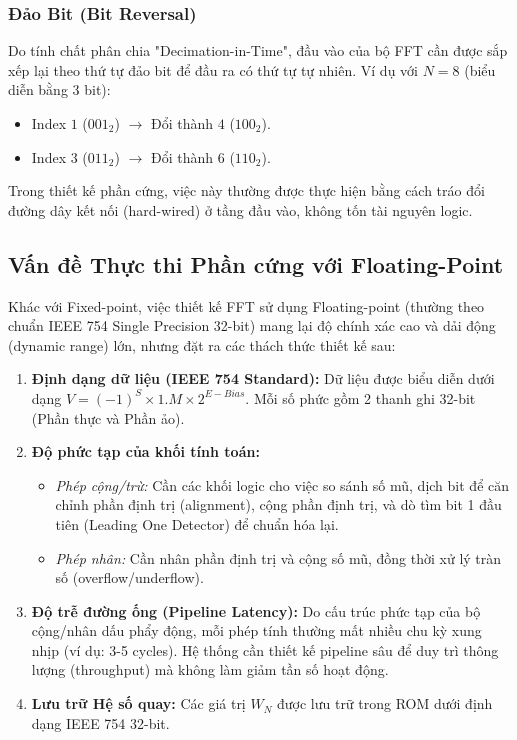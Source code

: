 \subsubsection{Đảo Bit (Bit Reversal)}
Do tính chất phân chia "Decimation-in-Time", đầu vào của bộ FFT cần được sắp xếp lại theo thứ tự đảo bit để đầu ra có thứ tự tự nhiên.
Ví dụ với $N=8$ (biểu diễn bằng 3 bit):
\begin{itemize}[label=-]
	\item Index $1$ ($001_2$) $\rightarrow$ Đổi thành $4$ ($100_2$).
	\item Index $3$ ($011_2$) $\rightarrow$ Đổi thành $6$ ($110_2$).
\end{itemize}
Trong thiết kế phần cứng, việc này thường được thực hiện bằng cách tráo đổi đường dây kết nối (hard-wired) ở tầng đầu vào, không tốn tài nguyên logic.

\subsection{Vấn đề Thực thi Phần cứng với Floating-Point}
Khác với Fixed-point, việc thiết kế FFT sử dụng Floating-point (thường theo chuẩn IEEE 754 Single Precision 32-bit) mang lại độ chính xác cao và dải động (dynamic range) lớn, nhưng đặt ra các thách thức thiết kế sau:

\begin{enumerate}
	\item \textbf{Định dạng dữ liệu (IEEE 754 Standard):} 
	Dữ liệu được biểu diễn dưới dạng $V = (-1)^S \times 1.M \times 2^{E-Bias}$.
	Mỗi số phức gồm 2 thanh ghi 32-bit (Phần thực và Phần ảo).
	
	\item \textbf{Độ phức tạp của khối tính toán:}
	\begin{itemize}
		\item \textit{Phép cộng/trừ:} Cần các khối logic cho việc so sánh số mũ, dịch bit để căn chỉnh phần định trị (alignment), cộng phần định trị, và dò tìm bit 1 đầu tiên (Leading One Detector) để chuẩn hóa lại.
		\item \textit{Phép nhân:} Cần nhân phần định trị và cộng số mũ, đồng thời xử lý tràn số (overflow/underflow).
	\end{itemize}
	
	\item \textbf{Độ trễ đường ống (Pipeline Latency):} 
	Do cấu trúc phức tạp của bộ cộng/nhân dấu phẩy động, mỗi phép tính thường mất nhiều chu kỳ xung nhịp (ví dụ: 3-5 cycles). Hệ thống cần thiết kế pipeline sâu để duy trì thông lượng (throughput) mà không làm giảm tần số hoạt động.
	
	\item \textbf{Lưu trữ Hệ số quay:} 
	Các giá trị $W_N$ được lưu trữ trong ROM dưới định dạng IEEE 754 32-bit.
\end{enumerate}
